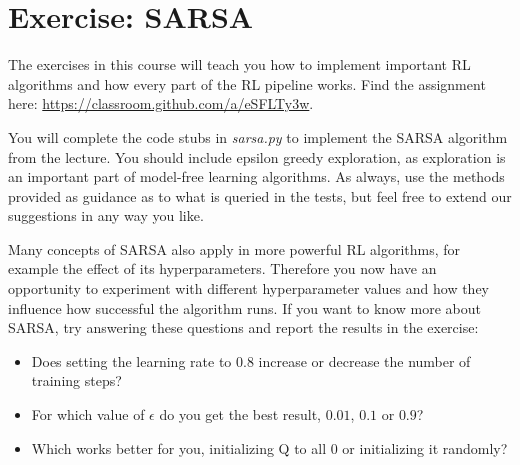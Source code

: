 \documentclass{exam}
\begin{document}
\section*{Exercise: SARSA}

\noindent
The exercises in this course will teach you how to implement important RL algorithms and how every part of the RL pipeline works.
Find the assignment here: \url{https://classroom.github.com/a/eSFLTy3w}.

\begin{questions}
	You will complete the code stubs in \emph{sarsa.py} to implement the SARSA algorithm from the lecture. You should include epsilon greedy exploration, as exploration is an important part of model-free learning algorithms. As always, use the methods provided as guidance as to what is queried in the tests, but feel free to extend our suggestions in any way you like.
	
	Many concepts of SARSA also apply in more powerful RL algorithms, for example the effect of its hyperparameters. Therefore you now have an opportunity to experiment with different hyperparameter values and how they influence how successful the algorithm runs. If you want to know more about SARSA, try answering these questions and report the results in the exercise:
	\begin{itemize}
		\item Does setting the learning rate to $0.8$ increase or decrease the number of training steps?
		\item For which value of $\epsilon$ do you get the best result, $0.01$, $0.1$ or $0.9$?
		\item Which works better for you, initializing Q to all $0$ or initializing it randomly?
	\end{itemize}
\end{questions}
\end{document}
